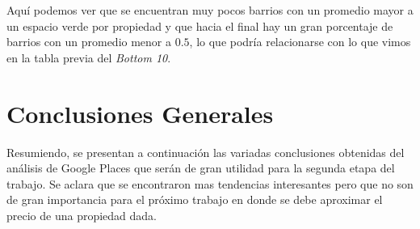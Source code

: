 \documentclass[a4paper, 10pt]{article}
\newcommand\tab[1][0.5cm]{\hspace*{#1}}
\begin{document}
				\tab Aquí podemos ver que se encuentran muy pocos barrios con un promedio mayor a un espacio verde por propiedad y
				que hacia el final hay un gran porcentaje de barrios con un promedio menor a $0.5$, lo que podría relacionarse con lo
				que vimos en la tabla previa del \emph{Bottom 10}.
				
		\section{Conclusiones Generales}
		
			Resumiendo, se presentan a continuación las variadas conclusiones obtenidas del análisis de 
			Google Places que serán de gran utilidad para la segunda etapa del trabajo. Se aclara que se 
			encontraron mas tendencias interesantes pero que no son de gran importancia para el 
			próximo trabajo en donde se debe aproximar el precio de una propiedad dada.			
			
\end{document}
